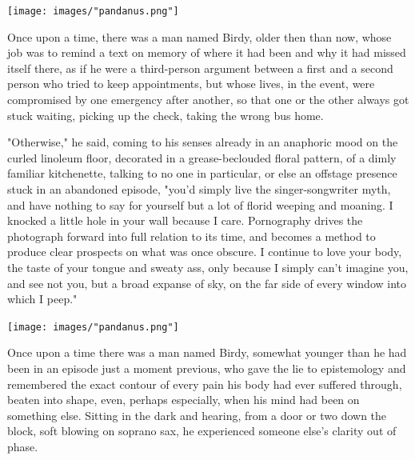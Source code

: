 \documentclass[
]{memoir}
\begin{document}
\begin{center}\texttt{[image: images/"pandanus.png"]}\end{center}

Once upon a time, there was a man named Birdy, older then than now,
whose job was to remind a text on memory of where it had been and why it
had missed itself there, as if he were a third-person argument between a
first and a second person who tried to keep appointments, but whose
lives, in the event, were compromised by one emergency after another, so
that one or the other always got stuck waiting, picking up the check,
taking the wrong bus home.

"Otherwise," he said, coming to his senses already in an anaphoric mood
on the curled linoleum floor, decorated in a grease-beclouded floral
pattern, of a dimly familiar kitchenette, talking to no one in
particular, or else an offstage presence stuck in an abandoned episode,
"you'd simply live the singer-songwriter myth, and have nothing to say
for yourself but a lot of florid weeping and moaning. I knocked a little
hole in your wall because I care. Pornography drives the photograph
forward into full relation to its time, and becomes a method to produce
clear prospects on what was once obscure. I continue to love your body,
the taste of your tongue and sweaty ass, only because I simply can't
imagine you, and see not you, but a broad expanse of sky, on the far
side of every window into which I peep."

\begin{center}\texttt{[image: images/"pandanus.png"]}\end{center}

Once upon a time there was a man named Birdy, somewhat younger than he
had been in an episode just a moment previous, who gave the lie to
epistemology and remembered the exact contour of every pain his body had
ever suffered through, beaten into shape, even, perhaps especially, when
his mind had been on something else. Sitting in the dark and hearing,
from a door or two down the block, soft blowing on soprano sax, he
experienced someone else's clarity out of phase.
\end{document}
